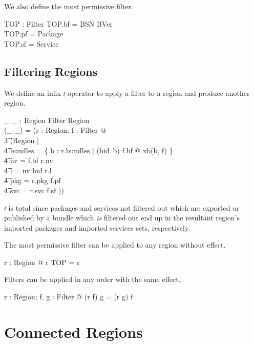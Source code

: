 \documentclass[a4paper,9pt]{article}
\begin{document}
We also define the most permissive filter.
\begin{axdef}
  TOP : Filter
\where
  TOP.bf = BSN \cross BVer \\
  TOP.pf = Package \\
  TOP.sf = Service \\
\end{axdef}

\subsection{Filtering Regions}

We define an infix $\wr$ operator to apply a filter to a region and produce another region.
\begin{axdef}
  \_ \wr \_ : Region \cross Filter \fun Region \\
\where
  (\_ \wr \_) = (\lambda r : Region;  f : Filter @ \\
\t3   (\mu Region | \\
\t4 bundles = \{ b : r.bundles | (bid~b) \in f.bf @ xb(b, f) \} \land \\
\t4 nv = f.bf \dres r.nv \land \\
\t4 l = nv \circ bid \circ r.l \land \\
\t4 pkg = r.pkg \cap f.pf \land \\
\t4 svc = r.svc \cap f.sf )) \\
\end{axdef}
$\wr$ is total since packages and services not filtered out which are exported or published by a
bundle which \textit{is} filtered out end up
in the resultant region's imported packages and imported services sets, respectively.

The most permissive filter can be applied to any region without effect.
\begin{argue}
  \shows \forall r : Region @ r \wr TOP = r \\
\end{argue}

Filters can be applied in any order with the same effect.
\begin{argue}
  \shows \forall r : Region; f, g : Filter @ (r \wr f) \wr g = (r \wr g) \wr f \\
\end{argue}

\clearpage
\section{Connected Regions}
\label{cha:connregions}
\end{document}
